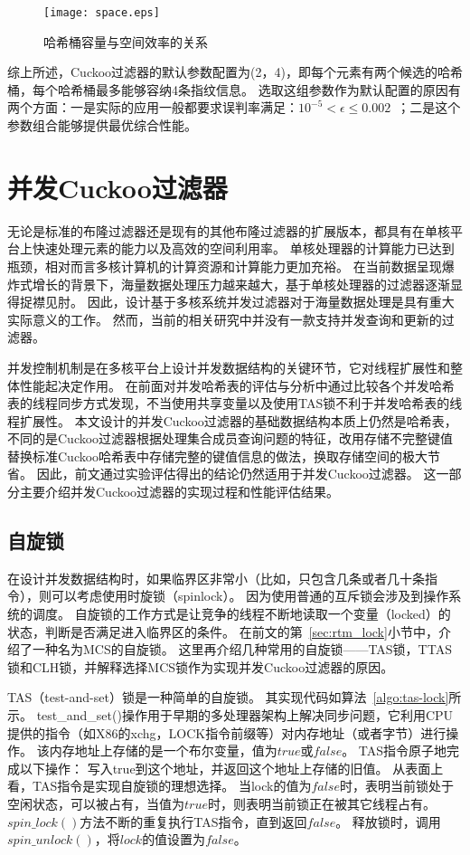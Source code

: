 \begin{figure}[htbp]
\centering
\texttt{[image: space.eps]}
\caption{哈希桶容量与空间效率的关系}
\label{fig:cbf_space}
\end{figure}

综上所述，Cuckoo过滤器的默认参数配置为(2，4)，即每个元素有两个候选的哈希桶，每个哈希桶最多能够容纳4条指纹信息。
选取这组参数作为默认配置的原因有两个方面：一是实际的应用一般都要求误判率满足：$ 10^{-5} < \epsilon \leq 0.002$~\cite{broder2004network}；二是这个参数组合能够提供最优综合性能。

\section{并发Cuckoo过滤器}
无论是标准的布隆过滤器还是现有的其他布隆过滤器的扩展版本，都具有在单核平台上快速处理元素的能力以及高效的空间利用率。
单核处理器的计算能力已达到瓶颈，相对而言多核计算机的计算资源和计算能力更加充裕。
在当前数据呈现爆炸式增长的背景下，海量数据处理压力越来越大，基于单核处理器的过滤器逐渐显得捉襟见肘。
因此，设计基于多核系统并发过滤器对于海量数据处理是具有重大实际意义的工作。
然而，当前的相关研究中并没有一款支持并发查询和更新的过滤器。

并发控制机制是在多核平台上设计并发数据结构的关键环节，它对线程扩展性和整体性能起决定作用。
在前面对并发哈希表的评估与分析中通过比较各个并发哈希表的线程同步方式发现，不当使用共享变量以及使用TAS锁不利于并发哈希表的线程扩展性。
本文设计的并发Cuckoo过滤器的基础数据结构本质上仍然是哈希表，不同的是Cuckoo过滤器根据处理集合成员查询问题的特征，改用存储不完整键值替换标准Cuckoo哈希表中存储完整的键值信息的做法，换取存储空间的极大节省。
因此，前文通过实验评估得出的结论仍然适用于并发Cuckoo过滤器。
这一部分主要介绍并发Cuckoo过滤器的实现过程和性能评估结果。

\subsection{自旋锁}
在设计并发数据结构时，如果临界区非常小（比如，只包含几条或者几十条指令），则可以考虑使用时旋锁（spinlock）。
因为使用普通的互斥锁会涉及到操作系统的调度。
自旋锁的工作方式是让竞争的线程不断地读取一个变量（locked）的状态，判断是否满足进入临界区的条件。
在前文的第~\ref{sec:rtm_lock}小节中，介绍了一种名为MCS的自旋锁。
这里再介绍几种常用的自旋锁——TAS锁，TTAS锁和CLH锁，并解释选择MCS锁作为实现并发Cuckoo过滤器的原因。

TAS（test-and-set）锁是一种简单的自旋锁。
其实现代码如算法~\ref{algo:tas-lock}所示。
test\_and\_set()操作用于早期的多处理器架构上解决同步问题，它利用CPU提供的指令（如X86的xchg，LOCK指令前缀等）对内存地址（或者字节）进行操作。
该内存地址上存储的是一个布尔变量，值为$true$或$false$。
TAS指令原子地完成以下操作：
写入true到这个地址，并返回这个地址上存储的旧值。
从表面上看，TAS指令是实现自旋锁的理想选择。
当lock的值为$false$时，表明当前锁处于空闲状态，可以被占有，当值为$true$时，则表明当前锁正在被其它线程占有。
$spin\_lock()$方法不断的重复执行TAS指令，直到返回$false$。
释放锁时，调用$spin\_unlock()$，将$lock$的值设置为$false$。

